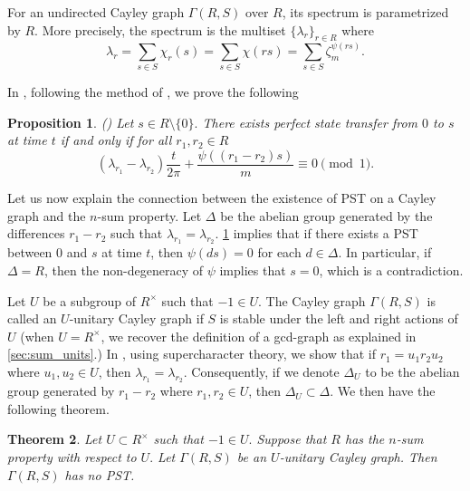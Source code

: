 \documentclass[11pt, a4paper]{amsart}
\newtheorem{thm}{Theorem}[section]
\newtheorem{prop}[thm]{Proposition}
\theoremstyle{definition}
\numberwithin{equation}{section}
\begin{document}
For an undirected Cayley graph $\Gamma(R,S)$ over $R$, its spectrum is parametrized by $R$. More precisely, the spectrum is the multiset  $\{\lambda_r\}_{r \in R}$ 
where 
\[ \lambda_r = \sum_{s \in S} \chi_r(s) = \sum_{s \in S} \chi(rs) = \sum_{s \in S} \zeta_m^{\psi(rs)}.\]

In \cite{nguyen2026supercharacters}, following the method of \cite{bavsic2009perfect},  we prove the following 
\begin{prop} (\cite[Theorem 4.1]{nguyen2026supercharacters}) \label{prop:orthogonal}
Let $s \in R \setminus \{0\}.$ There exists perfect state transfer from $0$ to $s$ at time $t$ if and only if for all $r_1, r_2 \in R$
    \[ (\lambda_{r_1}-\lambda_{r_2}) \frac{t}{2 \pi} + \frac{\psi((r_1-r_2)s)}{m} \equiv 0 \pmod{1}.\]
    
\end{prop}

Let us now explain the connection between the existence of PST on a Cayley graph and the $n$-sum property. 
Let $\Delta$ be the abelian group generated by the differences $r_1-r_2$ such that $\lambda_{r_1}=\lambda_{r_2}.$ \cref{prop:orthogonal} implies that if there exists a PST between $0$ and $s$ at time $t$, then $\psi(ds)=0$ for each $d \in \Delta. $ In particular, if $\Delta=R$, then the non-degeneracy of $\psi$ implies that $s=0$, which is a contradiction. 

Let $U$ be a subgroup of $R^{\times}$ such that $-1 \in U.$ The Cayley graph $\Gamma(R, S)$ is called an $U$-unitary Cayley graph if $S$ is stable under the left and right actions of $U$ (when $U=R^{\times}$, we recover the definition of a gcd-graph as explained in \cref{sec:sum_units}.) In \cite[Proposition 3.6]{nguyen2026supercharacters}, using supercharacter theory, we show that if $r_1 = u_1r_2 u_2$ where $u_1, u_2 \in U$, then $\lambda_{r_1}=\lambda_{r_2}.$
Consequently, if we denote $\Delta_U$ to be the abelian group generated by $r_1-r_2$ where $r_1, r_2 \in U$, then $\Delta_U \subset \Delta.$ We then have the following theorem. 

\begin{thm} \label{thm:pst-and-n-sum}
    Let $U \subset R^{\times}$ such that $-1 \in U.$ Suppose that $R$ has the $n$-sum property with respect to $U.$ Let $\Gamma(R,S)$ be an $U$-unitary Cayley graph. Then $\Gamma(R,S)$ has no PST. 
\end{thm}
\end{document}

